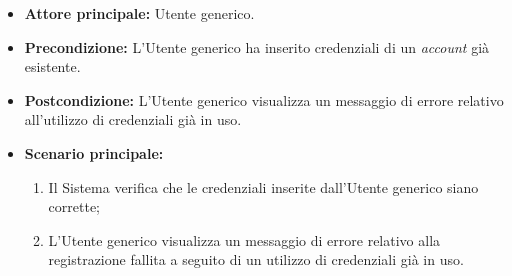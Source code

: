 \label{usecase:Errore registrazione account esistente}
\begin{itemize}

	\item \textbf{Attore principale:} Utente generico.

	\item \textbf{Precondizione:} L'Utente generico ha inserito credenziali di un \textit{account} già esistente.

	\item \textbf{Postcondizione:} L'Utente generico visualizza un messaggio di errore relativo all'utilizzo di credenziali già in uso.

	\item \textbf{Scenario principale:}
	\begin{enumerate}
        \item Il Sistema verifica che le credenziali inserite dall'Utente generico siano corrette;
        \item L'Utente generico visualizza un messaggio di errore relativo alla registrazione fallita a seguito di un utilizzo di credenziali già in uso.
	\end{enumerate}
	
\end{itemize}